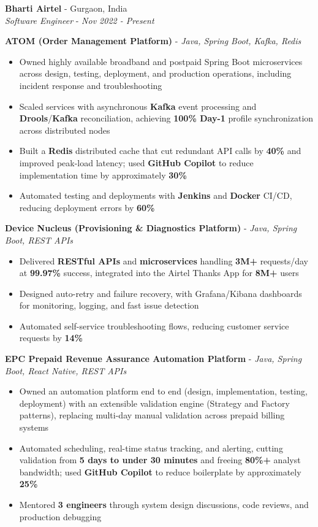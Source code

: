\documentclass[letterpaper,10pt]{article}
\newcommand{\resumeItem}[1]{
  \item\small{{#1 \vspace{-2pt}}}
}
\newcommand{\resumeSubheading}[4]{
  \vspace{-2pt}\item
    \textbf{#1} - #2 \\
    \textit{\small #3} - \textit{\small #4}\vspace{-7pt}
}
\newcommand{\resumeItemListStart}{\begin{itemize}[itemsep=0pt,topsep=2pt,parsep=0pt]}
\newcommand{\resumeItemListEnd}{\end{itemize}\vspace{-5pt}}
\begin{document}
    \resumeSubheading
      {Bharti Airtel}{Gurgaon, India}
      {Software Engineer}{Nov 2022 - Present}

      \vspace{4pt}
      \textbf{\small ATOM (Order Management Platform)} - \textit{\small Java, Spring Boot, Kafka, Redis} \\
      \vspace{-2pt}
      \resumeItemListStart
        \resumeItem{Owned highly available broadband and postpaid Spring Boot microservices across design, testing, deployment, and production operations, including incident response and troubleshooting}
        \resumeItem{Scaled services with asynchronous \textbf{Kafka} event processing and \textbf{Drools}/\textbf{Kafka} reconciliation, achieving \textbf{100\% Day-1} profile synchronization across distributed nodes}
        \resumeItem{Built a \textbf{Redis} distributed cache that cut redundant API calls by \textbf{40\%} and improved peak-load latency; used \textbf{GitHub Copilot} to reduce implementation time by approximately \textbf{30\%}}
        \resumeItem{Automated testing and deployments with \textbf{Jenkins} and \textbf{Docker} CI/CD, reducing deployment errors by \textbf{60\%}}
      \resumeItemListEnd

      \vspace{2pt}
      \textbf{\small Device Nucleus (Provisioning \& Diagnostics Platform)} - \textit{\small Java, Spring Boot, REST APIs} \\
      \vspace{-2pt}
      \resumeItemListStart
        \resumeItem{Delivered \textbf{RESTful APIs} and \textbf{microservices} handling \textbf{3M+} requests/day at \textbf{99.97\%} success, integrated into the Airtel Thanks App for \textbf{8M+} users}
        \resumeItem{Designed auto-retry and failure recovery, with Grafana/Kibana dashboards for monitoring, logging, and fast issue detection}
        \resumeItem{Automated self-service troubleshooting flows, reducing customer service requests by \textbf{14\%}}
      \resumeItemListEnd

      \vspace{2pt}
      \textbf{\small EPC Prepaid Revenue Assurance Automation Platform} - \textit{\small Java, Spring Boot, React Native, REST APIs} \\
      \vspace{-2pt}
      \resumeItemListStart
        \resumeItem{Owned an automation platform end to end (design, implementation, testing, deployment) with an extensible validation engine (Strategy and Factory patterns), replacing multi-day manual validation across prepaid billing systems}
        \resumeItem{Automated scheduling, real-time status tracking, and alerting, cutting validation from \textbf{5 days to under 30 minutes} and freeing \textbf{80\%+} analyst bandwidth; used \textbf{GitHub Copilot} to reduce boilerplate by approximately \textbf{25\%}}
        \resumeItem{Mentored \textbf{3 engineers} through system design discussions, code reviews, and production debugging}
      \resumeItemListEnd
\end{document}
